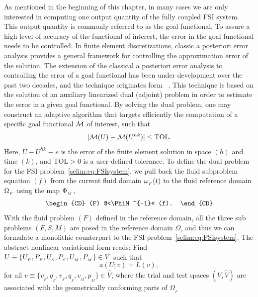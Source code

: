 As mentioned in the beginning of this chapter, in many cases we are
only interested in computing one output quantity of the fully coupled
FSI system. This output quantity is commonly referred to as the goal
functional.  To assure a high level of accuracy of the functional of
interest, the error in the goal functional needs to be controlled. In
finite element discretizations, classic a posteriori error analysis
provides a general framework for controlling the approximation error
of the solution.  The extension of the classical a posteriori error
analysis to controlling the error of a goal functional has been under
development over the past two decades, and the technique originates
form ~\cite{ErikssonEstepHansboEtAl1995, BeckerRannacher2001}. This
technique is based on the solution of an auxiliary linearized dual
(adjoint) problem in order to estimate the error in a given goal
functional. By solving the dual problem, one may construct an adaptive
algorithm that targets efficiently the computation of a specific goal
functional $\mathcal{M}$ of interest, such that
\begin{equation}
  \label{selim:eq:goalTOL}
|\mathcal{M}(U)-\mathcal{M}(U^{hk})| \leq \mathrm{TOL}.
\end{equation}
Here, $ U-U^{hk} \equiv e$ is the error of the finite element solution
in space $(h)$ and time $(k)$, and $\mathrm{TOL}>0$ is a user-defined
tolerance.  To define the dual problem for the FSI
problem~\eqref{selim:eq:FSIsystem}, we pull back the fluid subproblem
equation $(f)$ from the current fluid domain $\omega_{_{F}}(t)$ to the fluid
reference domain $\Omega_{_{F}}$ using the map $\Phi_{_{M}}$,
\begin{equation}
  \label{selim:eq:pullback}
  \begin{CD}
    (F) @<\PhiM^{-1}<< (f).
  \end{CD}
\end{equation}
With the fluid problem $(F)$ defined in the reference domain, all the
three sub problems $(F,S,M)$ are posed in the reference domain
$\Omega$, and thus we can formulate a monolithic counterpart to the
FSI problem~\eqref{selim:eq:FSIsystem}. The abstract nonlinear
variational form reads: Find $U\equiv \{ U_{_{F}}, P_{_{F}}, U_{_{S}}, P_{_{S}}, U_{_{M}},
P_{_{M}} \}\in V$ such that
\begin{equation}
\label{selim:eq:monolithic}
a(U;v) = L(v),
\end{equation}
for all $v\equiv \{ v_{_{F}}, q_{_{F}}, v_{_{S}}, q_{_{S}}, v_{_{M}}, p_{_{M}}
\}\in\hat{V}$, where the trial and test spaces $(V,\hat{V})$ are
associated with the geometrically conforming parts of $\Omega_{_{F}}$

